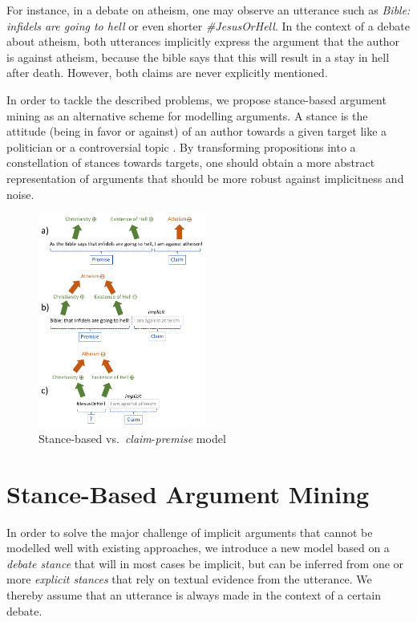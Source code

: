 \documentclass[11pt]{article}
\begin{document}
For instance, in a debate on atheism, one may observe an utterance such as \textit{Bible: infidels are going to hell} or even shorter \textit{\#JesusOrHell}.
In the context of a debate about atheism, both utterances implicitly express the argument that the author is against atheism, because the bible says that this will result in a stay in hell after death.
However, both claims are never explicitly mentioned.

In order to tackle the described problems, we propose stance-based argument mining as an alternative scheme for modelling arguments.
A stance is the attitude (being in favor or against) of an author towards a given target like a politician or a controversial topic \cite{StanceSemEval2016}.
By transforming propositions into a constellation of stances towards targets, one should obtain a more abstract representation of arguments that should be more robust against implicitness and noise.

\begin{figure}
  \includegraphics[width=0.49\textwidth]{figures/comparison_models_2.png}
  \caption{Stance-based vs.\ \textit{claim}-\textit{premise} model}
  \label{fig:comparison_models}
\end{figure}

\section{Stance-Based Argument Mining}
\label{sec:our_model}

In order to solve the major challenge of implicit arguments that cannot be modelled well with existing approaches, we introduce a new model based on a \textit{debate stance} that will in most cases be implicit, but can be inferred from one or more \textit{explicit stances} that rely on textual evidence from the utterance.
We thereby assume that an utterance is always made in the context of a certain debate.
\end{document}
